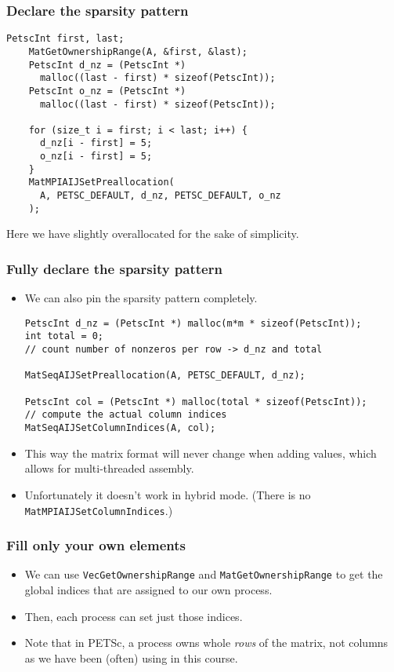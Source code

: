 \begin{frame}[fragile]
  \frametitle{Declare the sparsity pattern}
  \begin{lstlisting}[style=c, basicstyle=\ttfamily\scriptsize]
    PetscInt first, last;
    MatGetOwnershipRange(A, &first, &last);
    PetscInt d_nz = (PetscInt *)
      malloc((last - first) * sizeof(PetscInt));
    PetscInt o_nz = (PetscInt *)
      malloc((last - first) * sizeof(PetscInt));

    for (size_t i = first; i < last; i++) {
      d_nz[i - first] = 5;
      o_nz[i - first] = 5;
    }
    MatMPIAIJSetPreallocation(
      A, PETSC_DEFAULT, d_nz, PETSC_DEFAULT, o_nz
    );
  \end{lstlisting}
  Here we have slightly overallocated for the sake of simplicity.
\end{frame}

\begin{frame}[fragile]
  \frametitle{Fully declare the sparsity pattern}
  \begin{itemize}
  \item We can also pin the sparsity pattern completely.
    \begin{lstlisting}[style=c, basicstyle=\ttfamily\scriptsize]
PetscInt d_nz = (PetscInt *) malloc(m*m * sizeof(PetscInt));
int total = 0;
// count number of nonzeros per row -> d_nz and total

MatSeqAIJSetPreallocation(A, PETSC_DEFAULT, d_nz);

PetscInt col = (PetscInt *) malloc(total * sizeof(PetscInt));
// compute the actual column indices
MatSeqAIJSetColumnIndices(A, col);
    \end{lstlisting}
  \item This way the matrix format will never change when adding values, which
    allows for multi-threaded assembly.
  \item Unfortunately it doesn't work in hybrid mode. (There is no
    \texttt{MatMPIAIJSetColumnIndices}.)
  \end{itemize}
\end{frame}

\begin{frame}
  \frametitle{Fill only your own elements}
  \begin{itemize}
  \item We can use \texttt{VecGetOwnershipRange} and
    \texttt{MatGetOwnershipRange} to get the global indices that are assigned to
    our own process.
  \item Then, each process can set just those indices.
  \item Note that in PETSc, a process owns whole \emph{rows} of the matrix, not
    columns as we have been (often) using in this course.
  \end{itemize}
\end{frame}

